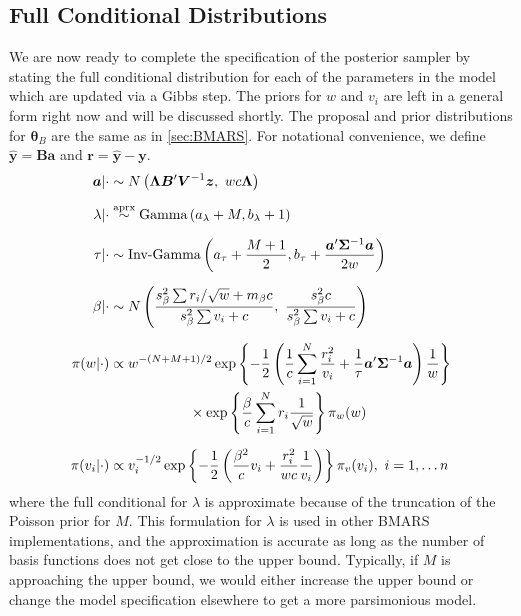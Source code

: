 \documentclass{article} %
\begin{document}
\subsection{Full Conditional Distributions}

We are now ready to complete the specification of the posterior sampler by stating the full conditional distribution for each of the parameters in the model which are updated via a Gibbs step. The priors for $w$ and $v_i$ are left in a general form right now and will be discussed shortly. The proposal and prior distributions for $\bm\theta_B$ are the same as in \cref{sec:BMARS}. For notational convenience, we define $\hat{\bm y} = \bm B\bm a$ and $\bm r = \hat{\bm y} - \bm y$. 
\begin{equation}\label{eq:gibbs}
\begin{aligned}
\bm a | \cdot &\sim  N\left( \bm\Lambda\bm B'\bm V^{-1}\bm z, \ wc\bm\Lambda\right) \\[1.4ex]
\lambda | \cdot &\stackrel{\text{aprx}}{\sim} \text{Gamma}\left(a_\lambda + M, b_\lambda + 1 \right) \\[1.4ex]
\tau | \cdot &\sim \text{Inv-Gamma}\left(a_\tau + \frac{M+1}{2}, b_\tau + \frac{\bm a' \bm\Sigma^{-1}\bm a}{2w}\right) \\[1.4ex]
\beta|\cdot &\sim N\left(\frac{s_\beta^2 \sum r_i/\sqrt w + m_\beta c}{s_\beta^2\sum v_i + c}, \ \frac{s_\beta^2c}{s_\beta^2\sum v_i + c}\right) \\[1.4ex]
\pi(w|\cdot) &\propto w^{-(N+M+1)/2}\exp\left\{-\frac{1}{2}\left(\frac{1}{c}\sum_{i=1}^N\frac{r_i^2}{v_i} + \frac{1}{\tau}\bm a'\bm\Sigma^{-1}\bm a\right)\frac{1}{w}\right\}\\ 
&\hspace*{2cm}\times\exp\left\{\frac{\beta }{c}\sum_{i=1}^Nr_i \frac{1}{\sqrt w}\right\}\pi_w(w) \\[1.4ex]
\pi(v_i|\cdot) &\propto v_i^{-1/2}\exp\left\{-\frac{1}{2}\left(\frac{\beta ^2}{c}v_i + \frac{r_i^2}{wc}\frac{1}{v_i}\right)\right\} \pi_v(v_i), \ i=1,\ldots n
\end{aligned}
\end{equation}
where the full conditional for $\lambda$ is approximate because of the truncation of the Poisson prior for $M$.  This formulation for $\lambda$ is used in other BMARS implementations, and the approximation is accurate as long as the number of basis functions does not get close to the upper bound.  Typically, if $M$ is approaching the upper bound, we would either increase the upper bound or change the model specification elsewhere to get a more parsimonious model.  
\end{document}
